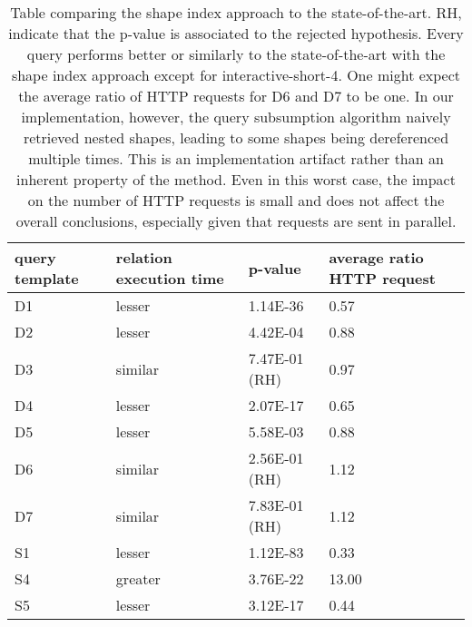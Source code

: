 \begin{table}
	\begin{center}
		\begin{tabular}{|l|l|l|l|}
			\hline
			query template & relation execution time & p-value & average ratio HTTP request \\
			\hline
			D1 & lesser & 1.14E-36 & 0.57 \\
			\hline
			D2 & lesser & 4.42E-04 & 0.88 \\
			\hline
			D3 & similar & 7.47E-01 (RH) & 0.97 \\
			\hline
			D4 & lesser & 2.07E-17 & 0.65 \\
			\hline
			D5 & lesser & 5.58E-03 & 0.88 \\
			\hline
			D6 & similar & 2.56E-01 (RH) & 1.12 \\
			\hline
			D7 & similar & 7.83E-01 (RH) & 1.12 \\
			\hline
			S1 & lesser & 1.12E-83 & 0.33 \\
			\hline
			S4 & greater & 3.76E-22 & 13.00 \\
			\hline
			S5 & lesser & 3.12E-17 & 0.44 \\
			\hline
		\end{tabular}
	\end{center}
	\caption{Table comparing the shape index approach to the state-of-the-art. RH, indicate that the p-value is associated to the rejected hypothesis. Every query performs better or similarly to the state-of-the-art with the shape index approach except for interactive-short-4. One might expect the average ratio of HTTP requests for D6 and D7 to be one. 
In our implementation, however, the query subsumption algorithm naively retrieved nested shapes, 
leading to some shapes being dereferenced multiple times. 
This is an implementation artifact rather than an inherent property of the method. 
Even in this worst case, the impact on the number of HTTP requests is small and does not affect the overall conclusions, 
especially given that requests are sent in parallel.}
	\label{tab:statSignificanceStateOfTheArt}
\end{table}